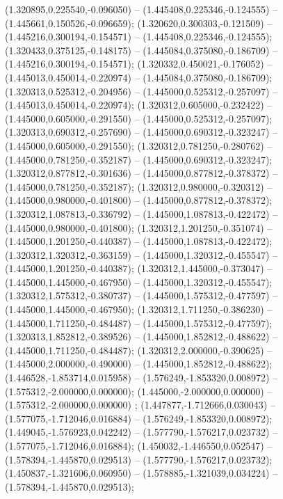 (1.320895,0.225540,-0.096050) -- (1.445408,0.225346,-0.124555) -- (1.445661,0.150526,-0.096659);
 (1.320620,0.300303,-0.121509) -- (1.445216,0.300194,-0.154571) -- (1.445408,0.225346,-0.124555);
 (1.320433,0.375125,-0.148175) -- (1.445084,0.375080,-0.186709) -- (1.445216,0.300194,-0.154571);
 (1.320332,0.450021,-0.176052) -- (1.445013,0.450014,-0.220974) -- (1.445084,0.375080,-0.186709);
 (1.320313,0.525312,-0.204956) -- (1.445000,0.525312,-0.257097) -- (1.445013,0.450014,-0.220974);
 (1.320312,0.605000,-0.232422) -- (1.445000,0.605000,-0.291550) -- (1.445000,0.525312,-0.257097);
 (1.320313,0.690312,-0.257690) -- (1.445000,0.690312,-0.323247) -- (1.445000,0.605000,-0.291550);
 (1.320312,0.781250,-0.280762) -- (1.445000,0.781250,-0.352187) -- (1.445000,0.690312,-0.323247);
 (1.320312,0.877812,-0.301636) -- (1.445000,0.877812,-0.378372) -- (1.445000,0.781250,-0.352187);
 (1.320312,0.980000,-0.320312) -- (1.445000,0.980000,-0.401800) -- (1.445000,0.877812,-0.378372);
 (1.320312,1.087813,-0.336792) -- (1.445000,1.087813,-0.422472) -- (1.445000,0.980000,-0.401800);
 (1.320312,1.201250,-0.351074) -- (1.445000,1.201250,-0.440387) -- (1.445000,1.087813,-0.422472);
 (1.320312,1.320312,-0.363159) -- (1.445000,1.320312,-0.455547) -- (1.445000,1.201250,-0.440387);
 (1.320312,1.445000,-0.373047) -- (1.445000,1.445000,-0.467950) -- (1.445000,1.320312,-0.455547);
 (1.320312,1.575312,-0.380737) -- (1.445000,1.575312,-0.477597) -- (1.445000,1.445000,-0.467950);
 (1.320312,1.711250,-0.386230) -- (1.445000,1.711250,-0.484487) -- (1.445000,1.575312,-0.477597);
 (1.320313,1.852812,-0.389526) -- (1.445000,1.852812,-0.488622) -- (1.445000,1.711250,-0.484487);
 (1.320312,2.000000,-0.390625) -- (1.445000,2.000000,-0.490000) -- (1.445000,1.852812,-0.488622);
 (1.446528,-1.853714,0.015958) -- (1.576249,-1.853320,0.008972) -- (1.575312,-2.000000,0.000000);
 (1.445000,-2.000000,0.000000) -- (1.575312,-2.000000,0.000000) ;
 (1.447877,-1.712666,0.030043) -- (1.577075,-1.712046,0.016884) -- (1.576249,-1.853320,0.008972);
 (1.449045,-1.576923,0.042242) -- (1.577790,-1.576217,0.023732) -- (1.577075,-1.712046,0.016884);
 (1.450032,-1.446550,0.052547) -- (1.578394,-1.445870,0.029513) -- (1.577790,-1.576217,0.023732);
 (1.450837,-1.321606,0.060950) -- (1.578885,-1.321039,0.034224) -- (1.578394,-1.445870,0.029513);
